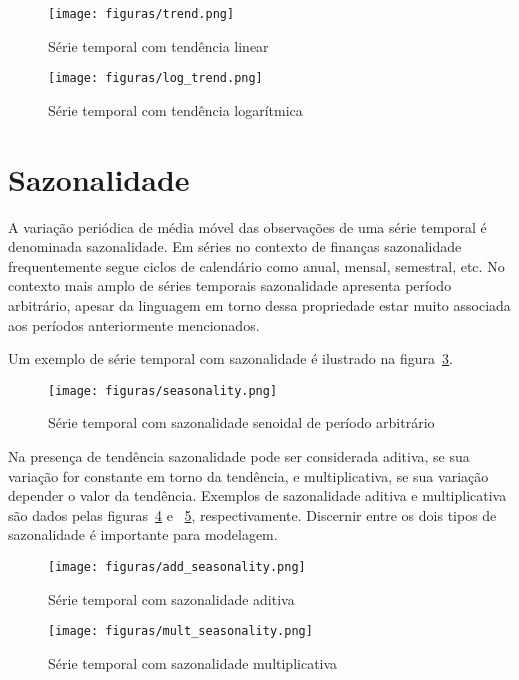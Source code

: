 \begin{figure}[H]
    \centering
    \texttt{[image: figuras/trend.png]}
    \caption{Série temporal com tendência linear}
    \label{fig:trend}
\end{figure}

\begin{figure}[H]
    \centering
    \texttt{[image: figuras/log\_trend.png]}
    \caption{Série temporal com tendência logarítmica}
    \label{fig:log_trend}
\end{figure}

\section{Sazonalidade}\label{sec:seasonality}

A variação periódica de média móvel das observações de uma série temporal é
denominada sazonalidade. Em séries no contexto de finanças sazonalidade
frequentemente segue ciclos de calendário como anual, mensal, semestral, etc.
No contexto mais amplo de séries temporais sazonalidade apresenta período
arbitrário, apesar da linguagem em torno dessa propriedade estar muito
associada aos períodos anteriormente mencionados.

Um exemplo de série temporal com sazonalidade é ilustrado na
figura~\ref{fig:seasonality}.

\begin{figure}[H]
    \centering
    \texttt{[image: figuras/seasonality.png]}
    \caption{Série temporal com sazonalidade senoidal de período arbitrário}
    \label{fig:seasonality}
\end{figure}

Na presença de tendência sazonalidade pode ser considerada aditiva, se sua
variação for constante em torno da tendência, e multiplicativa, se sua variação
depender o valor da tendência. Exemplos de sazonalidade aditiva e
multiplicativa são dados pelas figuras~\ref{fig:add_seasonality} e
~\ref{fig:mult_seasonality}, respectivamente. Discernir entre os dois tipos de
sazonalidade é importante para modelagem.

\begin{figure}[H]
    \centering
    \texttt{[image: figuras/add\_seasonality.png]}
    \caption{Série temporal com sazonalidade aditiva}
    \label{fig:add_seasonality}
\end{figure}

\begin{figure}[H]
    \centering
    \texttt{[image: figuras/mult\_seasonality.png]}
    \caption{Série temporal com sazonalidade multiplicativa}
    \label{fig:mult_seasonality}
\end{figure}

